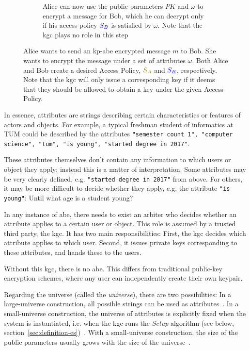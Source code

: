 \begin{figure}
\begin{subfigure}[c]{0.6\textwidth}
\begin{tikzpicture}[actor/.style={draw, minimum width=1.5cm}]
        \end{tikzpicture}
        \caption{Alice can now use the public parameters $PK$ and $\omega$ to encrypt a message for Bob, which he can decrypt only if his access policy $\textcolor{blue}{S_B}$ is satisfied by $\omega$. Note that the \acrshort{kgc} plays no role in this step}
    \end{subfigure}
    \caption[Interaction of Alice, Bob and KGC in an \acrshort{abes}]{
        Alice wants to send an \acrshort{kp-abe} encrypted message $m$ to Bob. She wants to encrypt the message under a set of attributes $\omega$.
        Both Alice and Bob create a desired Access Policy, $\textcolor{olive}{S_A}$ and $\textcolor{blue}{S_B}$, respectively.
        Note that the \acrshort{kgc} will only issue a corresponding key if it deems that they should be allowed to obtain a key under the given Access Policy.
    }
    \label{fig:abe-system}
\end{figure}
In essence, attributes are strings describing certain characteristics or features of actors and objects.
For example, a typical freshman student of informatics at TUM could be described by the attributes \texttt{"semester count 1", "computer science", "tum", "is young", "started degree in 2017"}.

These attributes themselves don't contain any information to which users or object they apply; instead this is a matter of interpretation.
Some attributes may be very clearly defined, e.g. \texttt{"started degree in 2017"} from above.
For others, it may be more difficult to decide whether they apply, e.g. the attribute \texttt{"is young"}: Until what age is a student young?

In any instance of \acrshort{abe}, there needs to exist an arbiter who decides whether an attribute applies to a certain user or object.
This role is assumed by a trusted third party, the \acrfull{kgc}.
It has two main responsibilities: First, the \acrshort{kgc} decides which attribute applies to which user.
Second, it issues private keys corresponding to these attributes, and hands these to the users.

Without this \acrshort{kgc}, there is no \acrshort{abe}.
This differs from traditional public-key encryption schemes, where any user can independently create their own keypair.

Regarding the \glsdesc{universe} (called the \emph{\gls{universe}}), there are two possibilities:
In a \gls{large-universe} construction, all possible strings can be used as attributes~\cite{goyal_attribute-based_2006}.
In a \gls{small-universe} construction, the universe of attributes is explicitly fixed when the system is instantiated, i.e. when the \acrshort{kgc} runs the \emph{Setup} algorithm (see below, section~\ref{sec:definition-es})~\cite{goyal_attribute-based_2006}.
With a \gls{small-universe} construction, the size of the public parameters usually grows with the size of the \gls{universe}~\cite{goyal_attribute-based_2006}.

